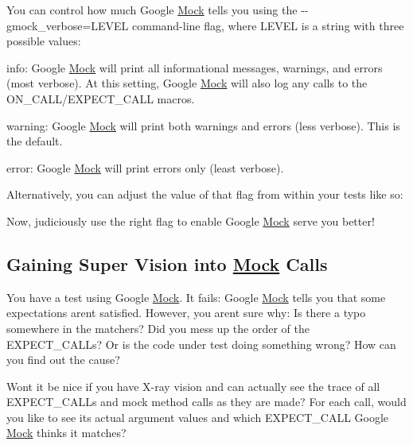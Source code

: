 You can control how much Google \mbox{\hyperlink{class_mock}{Mock}} tells you using the {\ttfamily -\/-\/gmock\+\_\+verbose=L\+E\+V\+EL} command-\/line flag, where {\ttfamily L\+E\+V\+EL} is a string with three possible values\+:


\begin{DoxyItemize}
\item {\ttfamily info}\+: Google \mbox{\hyperlink{class_mock}{Mock}} will print all informational messages, warnings, and errors (most verbose). At this setting, Google \mbox{\hyperlink{class_mock}{Mock}} will also log any calls to the {\ttfamily O\+N\+\_\+\+C\+A\+L\+L/\+E\+X\+P\+E\+C\+T\+\_\+\+C\+A\+LL} macros.
\item {\ttfamily warning}\+: Google \mbox{\hyperlink{class_mock}{Mock}} will print both warnings and errors (less verbose). This is the default.
\item {\ttfamily error}\+: Google \mbox{\hyperlink{class_mock}{Mock}} will print errors only (least verbose).
\end{DoxyItemize}

Alternatively, you can adjust the value of that flag from within your tests like so\+:


\begin{DoxyCode}{0}
\end{DoxyCode}


Now, judiciously use the right flag to enable Google \mbox{\hyperlink{class_mock}{Mock}} serve you better!

\subsection*{Gaining Super Vision into \mbox{\hyperlink{class_mock}{Mock}} Calls}

You have a test using Google \mbox{\hyperlink{class_mock}{Mock}}. It fails\+: Google \mbox{\hyperlink{class_mock}{Mock}} tells you that some expectations aren\textquotesingle{}t satisfied. However, you aren\textquotesingle{}t sure why\+: Is there a typo somewhere in the matchers? Did you mess up the order of the {\ttfamily E\+X\+P\+E\+C\+T\+\_\+\+C\+A\+LL}s? Or is the code under test doing something wrong? How can you find out the cause?

Won\textquotesingle{}t it be nice if you have X-\/ray vision and can actually see the trace of all {\ttfamily E\+X\+P\+E\+C\+T\+\_\+\+C\+A\+LL}s and mock method calls as they are made? For each call, would you like to see its actual argument values and which {\ttfamily E\+X\+P\+E\+C\+T\+\_\+\+C\+A\+LL} Google \mbox{\hyperlink{class_mock}{Mock}} thinks it matches?

